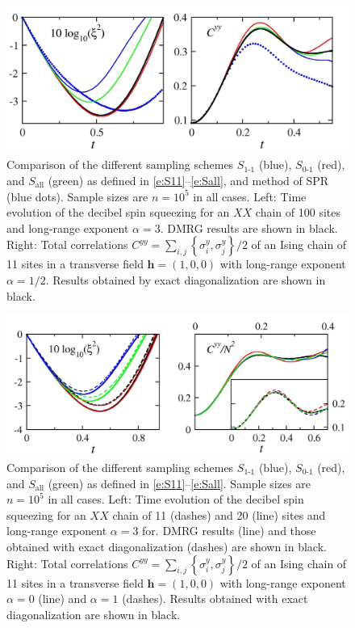 \documentclass[aps,prl,showpacs,amsmath,amssymb,superscriptaddress,reprint,10pt]{revtex4-1}
\newcommand{\mvec}[1]{\boldsymbol #1}
\begin{document}
\begin{figure}\centering
\includegraphics[width=\linewidth]{./XY_TF_compare_samplings.jpg}
\caption{\label{f:sampling}%
Comparison of the different sampling schemes $S_{\text{1-1}}$ (blue), $S_{\text{0-1}}$ (red), and $S_{\text{all}}$ (green) as defined in \eqref{e:S11}--\eqref{e:Sall}, and method of SPR (blue dots). Sample sizes are $n=10^5$ in all cases. Left: Time evolution of the decibel spin squeezing for an $XX$ chain of 100 sites and long-range exponent $\alpha=3$. DMRG results are shown in black. Right: Total correlations $C^{yy}=\sum_{i,j}\left\{\sigma_i^y,\sigma_j^y\right\}/2$ of an Ising chain of 11 sites in a transverse field $\mvec{h}=(1,0,0)$ with long-range exponent $\alpha=1/2$. Results obtained by exact diagonalization are shown in black.
}%
\end{figure}

\begin{figure}\centering
\includegraphics[width=\linewidth]{./benchmark_sizes_XY_alpha_TF.jpg}
\caption{\label{f:sampling_2}%
Comparison of the different sampling schemes $S_{\text{1-1}}$ (blue), $S_{\text{0-1}}$ (red), and $S_{\text{all}}$ (green) as defined in \eqref{e:S11}--\eqref{e:Sall}. Sample sizes are $n=10^5$ in all cases. Left: Time evolution of the decibel spin squeezing for an $XX$ chain of 11 (dashes) and 20 (line) sites and long-range exponent $\alpha=3$ for. DMRG results (line) and those obtained with exact diagonalization (dashes) are shown in black. Right: Total correlations $C^{yy}=\sum_{i,j}\left\{\sigma_i^y,\sigma_j^y\right\}/2$ of an Ising chain of 11 sites in a transverse field $\mvec{h}=(1,0,0)$ with long-range exponent $\alpha=0$ (line) and $\alpha=1$ (dashes). Results obtained with exact diagonalization are shown in black.
}%
\end{figure}
\end{document}
